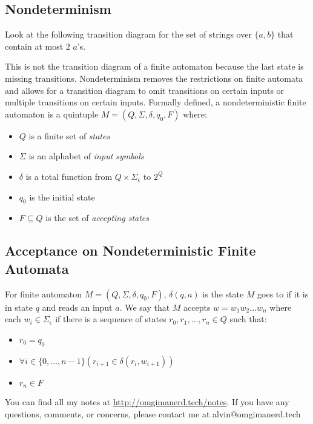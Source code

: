 \documentclass[letterpaper, 12pt]{math}
\begin{document}
\subsection*{Nondeterminism}
Look at the following transition diagram for the set of strings over \( \{a,b\}
\) that contain at most 2 \( a \)'s.
\begin{center}
\end{center}
This is not the transition diagram of a finite automaton because the last state
is missing transitions. Nondeterminism removes the restrictions on finite
automata and allows for a transition diagram to omit transitions on certain
inputs or multiple transitions on certain inputs. Formally defined, a
nondeterministic finite automaton is a quintuple \( M = (Q,\Sigma,\delta,
q_0,F) \) where:
\begin{itemize}
  \item \( Q \) is a finite set of \textit{states}
  \item \( \Sigma \) is an alphabet of \textit{input symbols}
  \item \( \delta \) is a total function from \( Q\times\Sigma_{\epsilon} \) to
  \( 2^Q \)
  \item \( q_0 \) is the initial state
  \item \( F\subseteq Q \) is the set of \textit{accepting states}
\end{itemize}

\subsection*{Acceptance on Nondeterministic Finite Automata}
For finite automaton \( M = (Q,\Sigma,\delta,q_0,F) \), \( \delta(q,a) \)
is the state \( M \) goes to if it is in state \( q \) and reads an input
\( a \). We say that \( M \) accepts \( w = w_1w_2\dots w_n \) where each
\( w_i\in\Sigma_{\epsilon} \) if there is a sequence of states \( r_0,r_1,
\dots,r_n\in Q \) such that:
\begin{itemize}
  \item \( r_0 = q_0 \)
  \item \( \forall{i}\in\{0,\dots,n-1\}(r_{i+1}\in\delta(r_i,w_{i+1})) \)
  \item \( r_n\in F \)
\end{itemize}

\begin{center}
  You can find all my notes at \url{http://omgimanerd.tech/notes}. If you have
  any questions, comments, or concerns, please contact me at
  alvin@omgimanerd.tech
\end{center}
\end{document}
